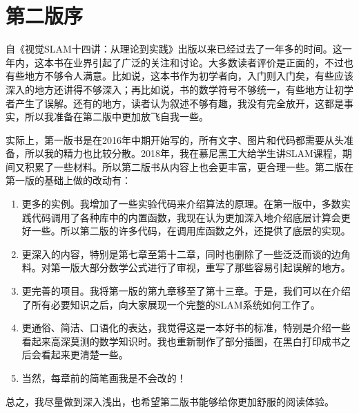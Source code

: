 \thispagestyle{empty}
\chapter*{第二版序}
自《视觉SLAM十四讲：从理论到实践》出版以来已经过去了一年多的时间。这一年内，这本书在业界引起了广泛的关注和讨论。大多数读者评价是正面的，不过也有些地方不够令人满意。比如说，这本书作为初学者向，入门则入门矣，有些应该深入的地方还讲得不够深入；再比如说，书的数学符号不够统一，有些地方让初学者产生了误解。还有的地方，读者认为叙述不够有趣，我没有完全放开，这都是事实，所以我准备在第二版中更加放飞自我一些。

实际上，第一版书是在2016年中期开始写的，所有文字、图片和代码都需要从头准备，所以我的精力也比较分散。2018年，我在慕尼黑工大给学生讲SLAM课程，期间又积累了一些材料。所以第二版书从内容上也会更丰富，更合理一些。第二版在第一版的基础上做的改动有：
\begin{enumerate}
\item 更多的实例。我增加了一些实验代码来介绍算法的原理。在第一版中，多数实践代码调用了各种库中的内置函数，我现在认为更加深入地介绍底层计算会更好一些。所以第二版的许多代码，在调用库函数之外，还提供了底层的实现。
\item 更深入的内容，特别是第七章至第十二章，同时也删除了一些泛泛而谈的边角料。对第一版大部分数学公式进行了审视，重写了那些容易引起误解的地方。
\item 更完善的项目。我将第一版的第九章移至了第十三章。于是，我们可以在介绍了所有必要知识之后，向大家展现一个完整的SLAM系统如何工作了。
\item 更通俗、简洁、口语化的表达，我觉得这是一本好书的标准，特别是介绍一些看起来高深莫测的数学知识时。我也重新制作了部分插图，在黑白打印成书之后会看起来更清楚一些。
\item 当然，每章前的简笔画我是不会改的！
\end{enumerate}

总之，我尽量做到深入浅出，也希望第二版书能够给你更加舒服的阅读体验。

\clearpage